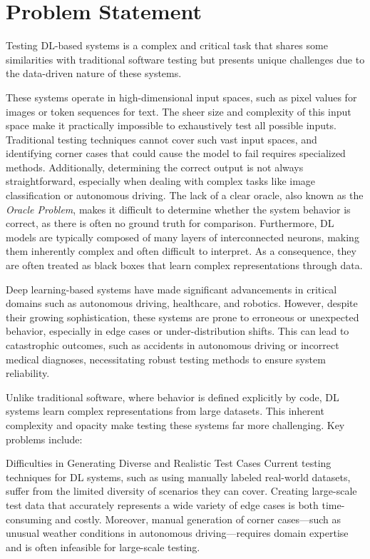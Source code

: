 \section{Problem Statement}
\label{sec:problem}
Testing DL-based systems is a complex and critical task that shares some similarities with traditional software testing but presents unique challenges due to the data-driven nature of these systems.

These systems operate in high-dimensional input spaces, such as pixel values for images or token sequences for text. The sheer size and complexity of this input space make it practically impossible to exhaustively test all possible inputs. Traditional testing techniques cannot cover such vast input spaces, and identifying corner cases that could cause the model to fail requires specialized methods.
Additionally, determining the correct output is not always straightforward, especially when dealing with complex tasks like image classification or autonomous driving. The lack of a clear oracle, also known as the \textit{Oracle Problem}, makes it difficult to determine whether the system behavior is correct, as there is often no ground truth for comparison.
Furthermore, DL models are typically composed of many layers of interconnected neurons, making them inherently complex and often difficult to interpret.
As a consequence, they are often treated as black boxes that learn complex representations through data.

Deep learning-based systems have made significant advancements in critical domains such as autonomous driving, healthcare, and robotics. 
However, despite their growing sophistication, these systems are prone to erroneous or unexpected behavior, especially in edge cases or under-distribution shifts. This can lead to catastrophic outcomes, such as accidents in autonomous driving or incorrect medical diagnoses, necessitating robust testing methods to ensure system reliability.

Unlike traditional software, where behavior is defined explicitly by code, DL systems learn complex representations from large datasets. This inherent complexity and opacity make testing these systems far more challenging. Key problems include:

Difficulties in Generating Diverse and Realistic Test Cases
Current testing techniques for DL systems, such as using manually labeled real-world datasets, suffer from the limited diversity of scenarios they can cover. Creating large-scale test data that accurately represents a wide variety of edge cases is both time-consuming and costly. Moreover, manual generation of corner cases—such as unusual weather conditions in autonomous driving—requires domain expertise and is often infeasible for large-scale testing.

